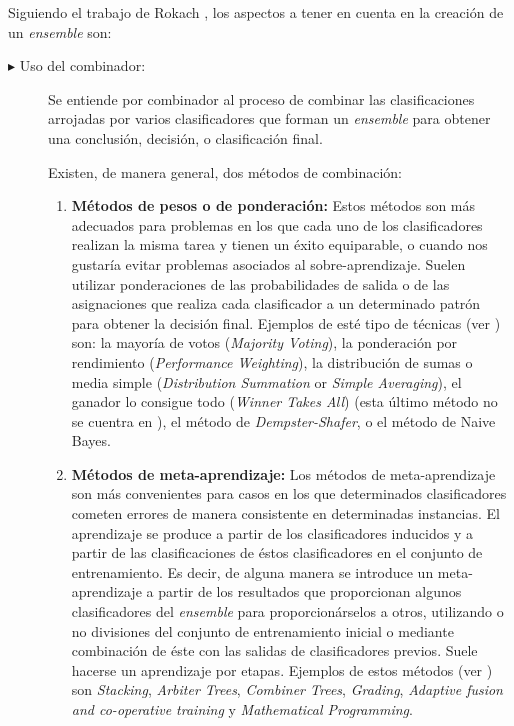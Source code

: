 Siguiendo el trabajo de Rokach \cite{Rokach2009}, los aspectos a
tener en cuenta en la creación de un \textit{ensemble} son:
\begin{description}
	\item[$\blacktriangleright$ Uso del combinador:] Se entiende por combinador al proceso
de combinar las
clasificaciones arrojadas por varios clasificadores que forman un \textit{ensemble} para
obtener una conclusión, decisión, o clasificación final.

Existen, de manera general, dos métodos de combinación:
\begin{enumerate}
	\item \textbf{Métodos de pesos o de ponderación:} Estos métodos son más adecuados para
problemas en los que cada uno de los clasificadores realizan la misma tarea y tienen un
éxito equiparable, o cuando nos gustaría evitar problemas asociados al sobre-aprendizaje.
Suelen utilizar ponderaciones de las probabilidades de salida o de las asignaciones que
realiza cada clasificador a un determinado patrón para obtener la decisión final. Ejemplos
de esté tipo de técnicas (ver \cite{Rokach2009}) son: la mayoría de votos
(\textit{Majority
Voting}), la ponderación por rendimiento (\textit{Performance Weighting}), la distribución
de sumas o media simple (\textit{Distribution Summation} or \textit{Simple Averaging}), el
ganador lo consigue todo (\textit{Winner Takes All}) \cite{Theodoridis2006} (esta último
método no se cuentra en \cite{Rokach2009}), el método de \textit{Dempster-Shafer}, o el
método de
Naive Bayes.

	\item \textbf{Métodos de meta-aprendizaje:} Los métodos de meta-aprendizaje son más
convenientes para casos en los que determinados clasificadores cometen
errores de manera consistente en determinadas instancias. El aprendizaje se produce a
partir de los clasificadores inducidos y a partir de las clasificaciones de éstos
clasificadores en el conjunto de entrenamiento. Es decir, de alguna manera se introduce
un meta-aprendizaje a partir de los resultados que proporcionan algunos clasificadores
del \textit{ensemble} para proporcionárselos a otros, utilizando o no divisiones del
conjunto de entrenamiento inicial o mediante combinación de éste con las salidas de
clasificadores previos. Suele hacerse un aprendizaje por etapas. Ejemplos de estos
métodos (ver \cite{Rokach2009}) son \textit{Stacking}, \textit{Arbiter Trees},
\textit{Combiner Trees}, \textit{Grading}, \textit{Adaptive fusion and co-operative
training} y \textit{Mathematical Programming}.


\end{enumerate}
\end{description}

